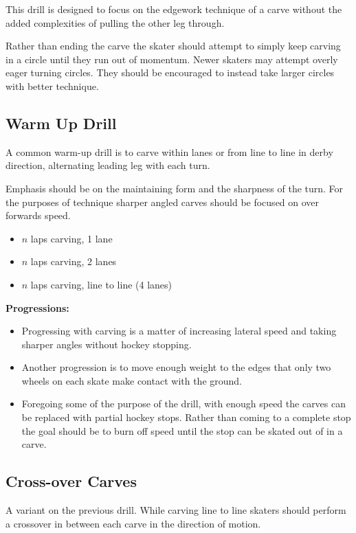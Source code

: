This drill is designed to focus on the edgework technique of a carve without the added complexities of pulling the other leg through.

Rather than ending the carve the skater should attempt to simply keep carving in a circle until they run out of momentum. 
Newer skaters may attempt overly eager turning circles.  
They should be encouraged to instead take larger circles with better technique. 


\subsection*{Warm Up Drill}

A common warm-up drill is to carve within lanes or from line to line in derby direction, alternating leading leg with each turn.    

Emphasis should be on the maintaining form and the sharpness of the turn. For the purposes of technique sharper angled carves should be focused on over forwards speed. 

\begin{itemize}
\item $n$ laps carving, 1 lane 
\item $n$ laps carving, 2 lanes
\item $n$ laps carving, line to line (4 lanes)
\end{itemize}


{\bf Progressions:}

\begin{itemize}
    \item Progressing with carving is a matter of increasing lateral speed and taking sharper angles without hockey stopping. 
    \item  Another progression is to move enough weight to the edges that only two wheels on each skate make contact with the ground.
    \item Foregoing some of the purpose of the drill, with enough speed the carves can be replaced with partial hockey stops. Rather than coming to a complete stop the goal should be to burn off speed until the stop can be skated out of in a carve.    
\end{itemize}


\subsection*{Cross-over Carves}

A variant on the previous drill. 
While carving line to line skaters should perform a crossover in between each carve in the direction of motion.

